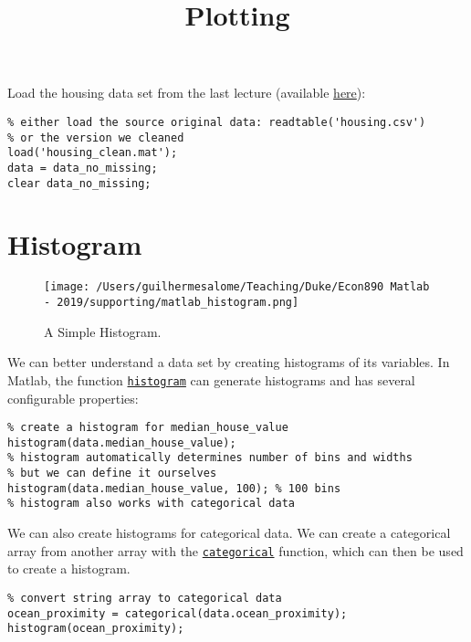 \documentclass[12pt, a4paper]{article}
\date{}
\title{Plotting}
\begin{document}
\maketitle
Load the housing data set from the last lecture (available \href{https://raw.githubusercontent.com/Salompas/handson-ml/master/datasets/housing/housing.csv}{here}):
\lstset{language=matlab,label= ,caption= ,captionpos=b,firstnumber=1,numbers=left,style=Matlab-editor}
\begin{lstlisting}
% either load the source original data: readtable('housing.csv')
% or the version we cleaned
load('housing_clean.mat');
data = data_no_missing;
clear data_no_missing;
\end{lstlisting}
\section{Histogram}
\label{sec:org6d2af92}
\begin{figure}[H]
\centering
\texttt{[image: /Users/guilhermesalome/Teaching/Duke/Econ890 Matlab - 2019/supporting/matlab\_histogram.png]}
\caption{\label{fig:orgc3e358e}
A Simple Histogram.}
\end{figure}

We can better understand a data set by creating histograms of its variables.
In Matlab, the function \href{https://www.mathworks.com/help/matlab/ref/matlab.graphics.chart.primitive.histogram.html}{\texttt{histogram}} can generate histograms and has several configurable properties:
\lstset{language=matlab,label= ,caption= ,captionpos=b,firstnumber=1,numbers=left,style=Matlab-editor}
\begin{lstlisting}
% create a histogram for median_house_value
histogram(data.median_house_value);
% histogram automatically determines number of bins and widths
% but we can define it ourselves
histogram(data.median_house_value, 100); % 100 bins
% histogram also works with categorical data
\end{lstlisting}
We can also create histograms for categorical data.
We can create a categorical array from another array with the \href{https://www.mathworks.com/help/matlab/ref/categorical.html}{\texttt{categorical}} function, which can then be used to create a histogram.
\lstset{language=matlab,label= ,caption= ,captionpos=b,firstnumber=1,numbers=left,style=Matlab-editor}
\begin{lstlisting}
% convert string array to categorical data
ocean_proximity = categorical(data.ocean_proximity);
histogram(ocean_proximity);
\end{lstlisting}
\end{document}
